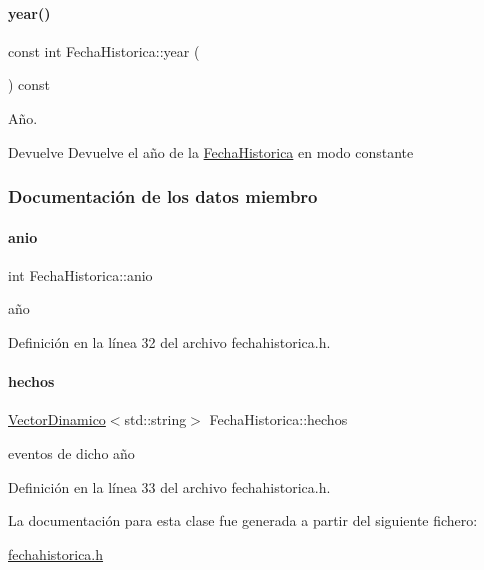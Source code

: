 \paragraph{\texorpdfstring{year()}{year()}\hspace{0.1cm}{\footnotesize\ttfamily [2/2]}}
{\footnotesize\ttfamily const int Fecha\+Historica\+::year (\begin{DoxyParamCaption}{ }\end{DoxyParamCaption}) const}



Año. 

\begin{DoxyReturn}{Devuelve}
Devuelve el año de la {\ttfamily \hyperlink{classFechaHistorica}{Fecha\+Historica}} en modo constante 
\end{DoxyReturn}


\subsubsection{Documentación de los datos miembro}
\mbox{\label{classFechaHistorica_ade873215978862ec3ca4fcaa1fd33a07}} 
\paragraph{\texorpdfstring{anio}{anio}}
{\footnotesize\ttfamily int Fecha\+Historica\+::anio\hspace{0.3cm}{\ttfamily [private]}}

año 

Definición en la línea 32 del archivo fechahistorica.\+h.

\mbox{\label{classFechaHistorica_a6b18e8a24361f418d233a7d921975a6c}} 
\paragraph{\texorpdfstring{hechos}{hechos}}
{\footnotesize\ttfamily \hyperlink{classVectorDinamico}{Vector\+Dinamico}$<$std\+::string$>$ Fecha\+Historica\+::hechos\hspace{0.3cm}{\ttfamily [private]}}

eventos de dicho año 

Definición en la línea 33 del archivo fechahistorica.\+h.



La documentación para esta clase fue generada a partir del siguiente fichero\+:\begin{DoxyCompactItemize}
\item 
\hyperlink{fechahistorica_8h}{fechahistorica.\+h}\end{DoxyCompactItemize}
